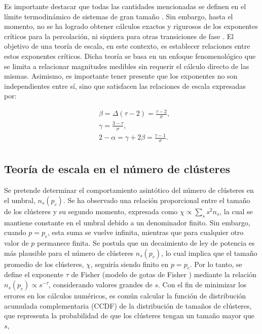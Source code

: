 	
Es importante destacar que todas las cantidades mencionadas se definen en el límite termodinámico de sistemas de gran tamaño \cite{bunde_fractals_2012}. Sin embargo, hasta el momento, no se ha logrado obtener cálculos exactos y rigurosos de los exponentes críticos para la percolación, ni siquiera para otras transiciones de fase \cite{stauffer_scaling_1979}. El objetivo de una teoría de escala, en este contexto, es establecer relaciones entre estos exponentes críticos. Dicha teoría se basa en un enfoque fenomenológico que se limita a relacionar magnitudes medibles sin requerir el cálculo directo de las mismas. Asimismo, es importante tener presente que los exponentes no son independientes entre sí, sino que satisfacen las relaciones de escala expresadas por:


 \begin{align}\label{eq:7}
 	&\beta = \Delta\left(\tau-2\right)=\frac{\tau-2}{\sigma},\\
 	&\gamma=\frac{3-\tau}{\sigma},\\
 	&2-\alpha= \gamma + 2\beta =\frac{\tau-1}{\sigma}.\\	
 	 \end{align}



\subsection{ Teoría de  escala en el número de clústeres }


Se pretende determinar el comportamiento asintótico del número de clústeres en el umbral, $n_s(p_c)$.  Se ha observado una relación proporcional entre el tamaño de los clústeres y su segundo momento, expresada como  $\chi \propto \sum_s s^2n_s$,   la cual se mantiene constante en el umbral debido a un denominador finito.  
Sin embargo, cuando $p = p_c$, esta suma se vuelve infinita, mientras que para cualquier otro valor de $p$ permanece finita. Se postula que un decaimiento de ley de potencia es más plausible para el número de clústeres $n_s(p_c)$, lo cual implica que el tamaño promedio de los clústeres, $\chi$, seguiría siendo finito en $p = p_c$. Por lo tanto, se define el exponente $\tau$ de Fisher (modelo de gotas de Fisher \cite{fisher_theory_1967}) mediante la relación $n_s(p_c) \propto s^{-\tau}$, considerando valores grandes de $s$. Con el fin de minimizar los errores en los cálculos numéricos, es común calcular la función de distribución acumulada complementaria (CCDF) de la distribución de tamaños de clústeres, que representa la probabilidad de que los clústeres tengan un tamaño mayor que $s$,

